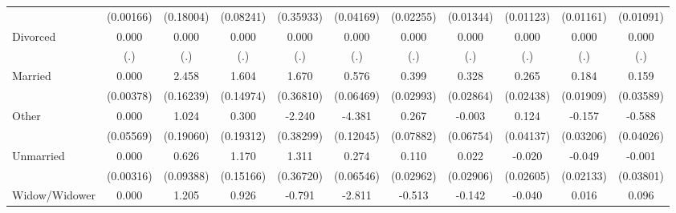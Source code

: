 {\begin{tabular}{l*{10}{c}}
                    &   (0.00166)         &   (0.18004)         &   (0.08241)         &   (0.35933)         &   (0.04169)         &   (0.02255)         &   (0.01344)         &   (0.01123)         &   (0.01161)         &   (0.01091)         \\
Divorced            &       0.000         &       0.000         &       0.000         &       0.000         &       0.000         &       0.000         &       0.000         &       0.000         &       0.000         &       0.000         \\
                    &         (.)         &         (.)         &         (.)         &         (.)         &         (.)         &         (.)         &         (.)         &         (.)         &         (.)         &         (.)         \\
Married             &       0.000         &       2.458\sym{***}&       1.604\sym{***}&       1.670\sym{***}&       0.576\sym{***}&       0.399\sym{***}&       0.328\sym{***}&       0.265\sym{***}&       0.184\sym{***}&       0.159\sym{***}\\
                    &   (0.00378)         &   (0.16239)         &   (0.14974)         &   (0.36810)         &   (0.06469)         &   (0.02993)         &   (0.02864)         &   (0.02438)         &   (0.01909)         &   (0.03589)         \\
Other               &       0.000         &       1.024\sym{***}&       0.300         &      -2.240\sym{***}&      -4.381\sym{***}&       0.267\sym{***}&      -0.003         &       0.124\sym{**} &      -0.157\sym{***}&      -0.588\sym{***}\\
                    &   (0.05569)         &   (0.19060)         &   (0.19312)         &   (0.38299)         &   (0.12045)         &   (0.07882)         &   (0.06754)         &   (0.04137)         &   (0.03206)         &   (0.04026)         \\
Unmarried           &       0.000         &       0.626\sym{***}&       1.170\sym{***}&       1.311\sym{***}&       0.274\sym{***}&       0.110\sym{***}&       0.022         &      -0.020         &      -0.049\sym{*}  &      -0.001         \\
                    &   (0.00316)         &   (0.09388)         &   (0.15166)         &   (0.36720)         &   (0.06546)         &   (0.02962)         &   (0.02906)         &   (0.02605)         &   (0.02133)         &   (0.03801)         \\
Widow/Widower       &       0.000         &       1.205\sym{***}&       0.926\sym{***}&      -0.791         &      -2.811\sym{***}&      -0.513\sym{***}&      -0.142\sym{***}&      -0.040         &       0.016         &       0.096\sym{*}  \\

\end{tabular}}
